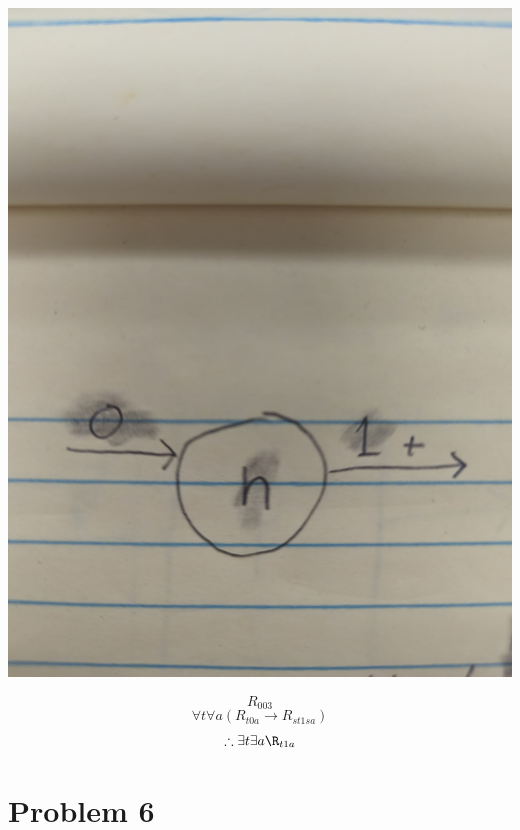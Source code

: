 \documentclass[12pt]{article}
\begin{document}
\includegraphics[width=\textwidth]{5}


\[ R_{003} \]
\[ \forall t \forall a (R_{t0a} \rightarrow R_{st1sa}) \]
\[ \therefore \exists t \exists a \R_{t1a} \]


\section*{Problem 6}
\end{document}
